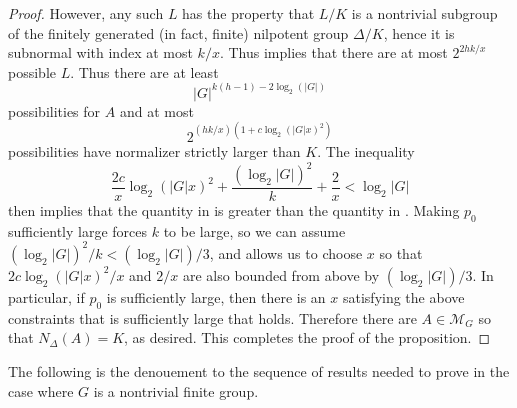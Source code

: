 \documentclass[11pt]{article}
\theoremstyle{plain}
\theoremstyle{definition}
\theoremstyle{remark}
\newcommand{\calM}{\mathcal{M}}
\newcommand{\Del}{\Delta}
\newenvironment{pf}{\begin{proof}}{\end{proof}}
\begin{document}
\begin{pf}
However, any such $L$ has the property that $L / K$ is a nontrivial subgroup of the finitely generated (in fact, finite) nilpotent group $\Del / K$, hence it is subnormal with index at most $k / x$. Thus \cite[Thm.\ 2.3]{LubotzkySegal} implies that there are at most $2^{2 h k/x}$ possible $L$. Thus there are at least
\begin{equation}\label{eq:NormalBound3}
|G|^{k(h - 1) - 2 \log_2(|G|)}
\end{equation}
possibilities for $A$ and at most
\begin{equation}\label{eq:NormalBound4}
2^{(h k / x)(1 + c \log_2(|G| x)^2)}
\end{equation}
possibilities have normalizer strictly larger than $K$. The inequality
\begin{equation}\label{eq:NormalBound5}
\frac{2 c}{x} \log_2(|G| x)^2 + \frac{(\log_2 |G|)^2}{k} + \frac{2}{x} < \log_2 |G|
\end{equation}
then implies that the quantity in  is greater than the quantity in . Making $p_0$ sufficiently large forces $k$ to be large, so we can assume $(\log_2 |G|)^2 / k < (\log_2 |G|) / 3$, and allows us to choose $x$ so that $2 c \log_2(|G| x)^2 / x$ and $2 / x$ are also bounded from above by $(\log_2 |G|) / 3$. In particular, if $p_0$ is sufficiently large, then there is an $x$ satisfying the above constraints that is sufficiently large that  holds. Therefore there are $A \in \calM_G$ so that $N_\Del(A) = K$, as desired. This completes the proof of the proposition.
\end{pf}

The following is the denouement to the sequence of results needed to prove  in the case where $G$ is a nontrivial finite group.
\end{document}
